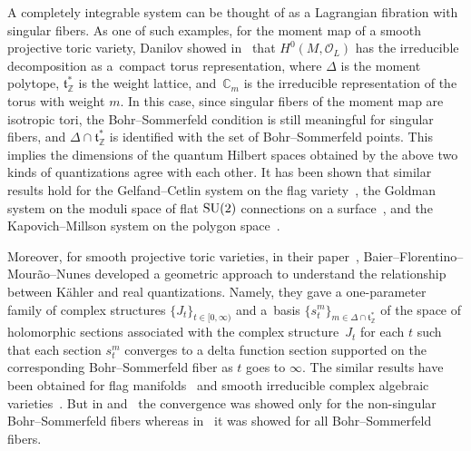 \documentclass[10pt,a4paper]{amsart}
\numberwithin{equation}{section}
\newcommand{\C}{\mathbb{C}}
\newcommand{\Z}{\mathbb{Z}}
\newcommand{\CO}{\mathcal O}
\def\t{\mathfrak t}
\begin{document}
A completely integrable system can be thought of as a Lagrangian fibration with singular fibers. As one of such examples, for the moment map of a smooth projective toric variety, Danilov showed in~\cite{Dan} that $H^0(M,\CO_L)$ has the irreducible decomposition \smash{$H^0(M,\CO_L)=\bigoplus_{m \in\Delta \cap \t^*_{\Z}}\C_m$} as a~compact torus representation, where $\Delta$ is the moment polytope, $\t^*_{\Z}$ is the weight lattice, and~$\C_m$ is the irreducible representation of the torus with weight $m$. In this case, since singular fibers of the moment map are isotropic tori, the Bohr--Sommerfeld condition is still meaningful for singular fibers, and $\Delta \cap \t^*_{\Z}$ is identified with the set of Bohr--Sommerfeld points. This implies the dimensions of the quantum Hilbert spaces obtained by the above two kinds of quantizations agree with each other. It has been shown that similar results hold for the Gelfand--Cetlin system on the flag variety~\cite{GuS4}, the Goldman system on the moduli space of flat ${\rm SU}(2)$ connections on a surface~\cite{JW1}, and the Kapovich--Millson system on the polygon space~\cite{Kamiyama}.

Moreover, for smooth projective toric varieties, in their paper~\cite{BFMN}, Baier--Florentino--Mour\~ao--Nunes developed a geometric approach to understand the relationship between K\"ahler and real quantizations. Namely, they gave a one-parameter family of complex structures $\{J_t\}_{t\in[0,\infty)}$ and a~basis $\{s_t^m\}_{m\in \Delta \cap \t^*_{\Z}}$ of the space of holomorphic sections associated with the complex structure~$J_t$ for each $t$ such that each section $s_t^m$ converges to a delta function section supported on the corresponding Bohr--Sommerfeld fiber as $t$ goes to $\infty$. The similar results have been obtained for flag manifolds~\cite{Hamilton-Konno} and smooth irreducible complex algebraic varieties~\cite{Hamilton-Harada-Kaveh}. But in \cite{Hamilton-Konno} and~\cite{Hamilton-Harada-Kaveh} the convergence was showed only for the non-singular Bohr--Sommerfeld fibers whereas in~\cite{BFMN} it was showed for all Bohr--Sommerfeld fibers.
\end{document}
